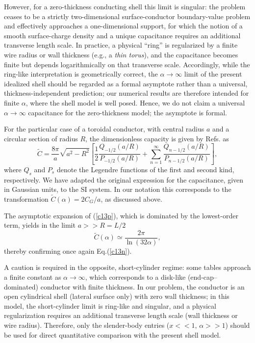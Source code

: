 \documentclass[12pt]{article}
\begin{document}
However, for a zero-thickness conducting shell this limit is singular: the
problem ceases to be a strictly two-dimensional surface-conductor
boundary-value problem and effectively approaches a one-dimensional support,
for which the notion of a smooth surface-charge density and a unique
capacitance requires an additional transverse length scale. In practice, a
physical ``ring'' is regularized by a finite wire radius or wall thickness
(e.g., a \textit{thin torus}), and the capacitance becomes finite but depends
logarithmically on that transverse scale. Accordingly, while the ring-like
interpretation is geometrically correct, the $\alpha\rightarrow\infty$ limit
of the present idealized shell should be regarded as a formal asymptote rather
than a universal, thickness-independent prediction; our numerical results are
therefore intended for finite $\alpha$, where the shell model is well posed.
Hence, we do not claim a universal $\alpha\rightarrow\infty$ capacitance for
the zero-thickness model; the asymptote is formal.

For the particular case of a toroidal conductor, with central radius $a$ and a
circular section of radius $R$, the dimensionless capacity is given by
Refs.\cite{t1,t2,t3} as%
\begin{equation}
\widetilde{C}=\frac{8\pi}{a}\sqrt{a^{2}-R^{2}}\left[  \frac{1}{2}%
\frac{Q_{-1/2}(a/R)}{P_{-1/2}(a/R)}+\sum\limits_{n=1}^{\infty}\frac{Q_{n-1/2}%
(a/R)}{P_{n-1/2}(a/R)}\right]  , \label{c13p}%
\end{equation}
where $Q_{s}$ and $P_{s}$ denote the Legendre functions of the first and
second kind, respectively. We have adapted the original expression for the
capacitance, given in Gaussian units, to the SI system. In our notation this
corresponds to the transformation $\widetilde{C}(\alpha)=2C_{G}/a$, as
discussed above.

The asymptotic expansion of (\ref{c13p}), which is dominated by the
lowest-order term, yields in the limit $a>>R=L/2$%
\[
\widetilde{C}(\alpha)\simeq\frac{2\pi}{\ln(32\alpha)},
\]
thereby confirming once again Eq.(\ref{c13n}).

A caution is required in the opposite, short-cylinder regime: some tables
approach a finite constant as $\alpha\rightarrow\infty$, which corresponds to
a disk-like (end-cap--dominated) conductor with finite thickness. In our
problem, the conductor is an open cylindrical shell (lateral surface only)
with zero wall thickness; in this model, the short-cylinder limit is ring-like
and singular, and a physical regularization requires an additional transverse
length scale (wall thickness or wire radius). Therefore, only the slender-body
entries ($x<<1$, $\alpha>>1$) should be used for direct quantitative
comparison with the present shell model.
\end{document}
